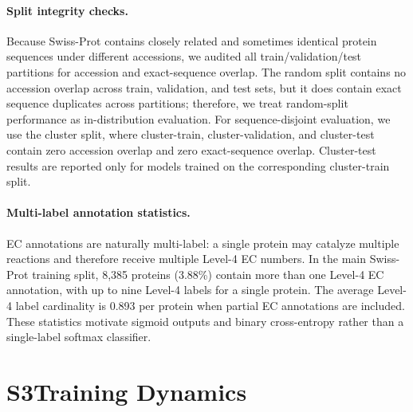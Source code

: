\documentclass[11pt,a4paper]{article}
\begin{document}
\paragraph{Split integrity checks.}
Because Swiss-Prot contains closely related and sometimes identical protein sequences
under different accessions, we audited all train/validation/test partitions for
accession and exact-sequence overlap. The random split contains no accession overlap
across train, validation, and test sets, but it does contain exact sequence duplicates
across partitions; therefore, we treat random-split performance as in-distribution
evaluation. For sequence-disjoint evaluation, we use the cluster split, where
cluster-train, cluster-validation, and cluster-test contain zero accession overlap
and zero exact-sequence overlap. Cluster-test results are reported only for models
trained on the corresponding cluster-train split.

\paragraph{Multi-label annotation statistics.}
EC annotations are naturally multi-label: a single protein may catalyze multiple
reactions and therefore receive multiple Level-4 EC numbers. In the main Swiss-Prot
training split, 8{,}385 proteins (3.88\%) contain more than one Level-4 EC
annotation, with up to nine Level-4 labels for a single protein. The average
Level-4 label cardinality is 0.893 per protein when partial EC annotations are
included. These statistics motivate sigmoid outputs and binary cross-entropy
rather than a single-label softmax classifier.

\section*{S3\quad Training Dynamics}
\end{document}
